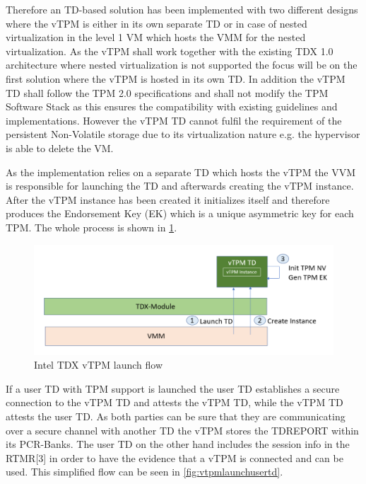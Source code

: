 \documentclass[sigplan,screen,nonacm]{acmart}
\begin{document}
Therefore an TD-based solution has been implemented with two different designs where the vTPM is either in its own separate TD or in case of nested virtualization in the level 1 VM which hosts the VMM for the nested virtualization.
As the vTPM shall work together with the existing TDX 1.0 architecture where nested virtualization is not supported the focus will be on the first solution where the vTPM is hosted in its own TD\cite[p. 5]{Intel-vTPM}.
In addition the vTPM TD shall follow the TPM 2.0 specifications and shall not modify the TPM Software Stack as this ensures the compatibility with existing guidelines and implementations\cite[p. 5]{Intel-vTPM}.
However the vTPM TD cannot fulfil the requirement of the persistent Non-Volatile storage due to its virtualization nature e.g. the hypervisor is able to delete the VM.

As the implementation relies on a separate TD which hosts the vTPM the VVM is responsible for launching the TD and afterwards creating the vTPM instance.
After the vTPM instance has been created it initializes itself and therefore produces the Endorsement Key (EK) which is a unique asymmetric key for each TPM.
The whole process is shown in \cref{fig:vtpmlaunch}.

\begin{figure}
  \centering
  \includegraphics[width=\linewidth]{pictures/vTPM_launch.png}
  \caption{Intel TDX vTPM launch flow \cite{Intel-vTPM}}
  \label{fig:vtpmlaunch}
\end{figure}

If a user TD with TPM support is launched the user TD establishes a secure connection to the vTPM TD and attests the vTPM TD, while the vTPM TD attests the user TD.
As both parties can be sure that they are communicating over a secure channel with another TD the vTPM stores the TDREPORT within its PCR-Banks.
The user TD on the other hand includes the session info in the RTMR[3] in order to have the evidence that a vTPM is connected and can be used.
This simplified flow can be seen in \cref{fig:vtpmlaunchusertd}.
\end{document}
